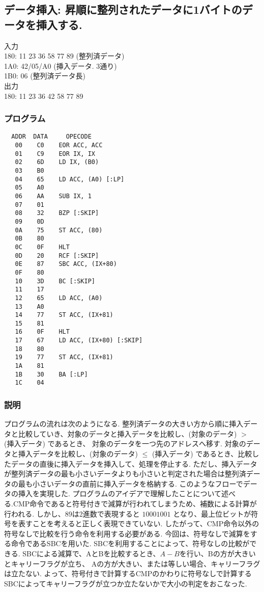 \documentclass[titlepage]{jsarticle}
\theoremstyle{definition}
\begin{document}
\subsection{データ挿入: 昇順に整列されたデータに1バイトのデータを挿入する.}
入力 \\
180: 11 23 36 58 77 89 (整列済データ) \\
1A0: 42/05/A0 (挿入データ. 3通り) \\
1B0: 06 (整列済データ長) \\

出力 \\
180: 11 23 36 42 58 77 89 \\

\subsubsection{プログラム}
\begin{lstlisting}
  ADDR  DATA     OPECODE
   00    C0    EOR ACC, ACC
   01    C9    EOR IX, IX
   02    6D    LD IX, (B0)
   03    B0
   04    65    LD ACC, (A0) [:LP]
   05    A0
   06    AA    SUB IX, 1
   07    01
   08    32    BZP [:SKIP]
   09    0D
   0A    75    ST ACC, (80)
   0B    80
   0C    0F    HLT
   0D    20    RCF [:SKIP]
   0E    87    SBC ACC, (IX+80)
   0F    80
   10    3D    BC [:SKIP]
   11    17
   12    65    LD ACC, (A0)
   13    A0
   14    77    ST ACC, (IX+81)
   15    81
   16    0F    HLT
   17    67    LD ACC, (IX+80) [:SKIP]
   18    80
   19    77    ST ACC, (IX+81)
   1A    81
   1B    30    BA [:LP]
   1C    04
\end{lstlisting}


\subsubsection{説明}
プログラムの流れは次のようになる.
整列済データの大きい方から順に挿入データと比較していき、対象のデータと挿入データを比較し、(対象のデータ) $>$ (挿入データ) であるとき、
対象のデータを一つ先のアドレスへ移す.
対象のデータと挿入データを比較し、(対象のデータ) $\leq$ (挿入データ) であるとき、比較したデータの直後に挿入データを挿入して、処理を停止する.
ただし、挿入データが整列済データの最も小さいデータよりも小さいと判定された場合は整列済データの最も小さいデータの直前に挿入データを格納する.
このようなフローでデータの挿入を実現した.
プログラムのアイデアで理解したことについて述べる.CMP命令であると符号付きで減算が行われてしまうため、補数による計算が行われる.
しかし、89は2進数で表現すると $10001001$ となり、最上位ビットが符号を表すことを考えると正しく表現できていない.
したがって、CMP命令以外の符号なしで比較を行う命令を利用する必要がある.
今回は、符号なしで減算をする命令であるSBCを用いた.
SBCを利用することによって、符号なしの比較ができる.
SBCによる減算で、AとBを比較するとき、$A - B$を行い、Bの方が大きいとキャリーフラグが立ち、
Aの方が大きい、または等しい場合、キャリーフラグは立たない.
よって、符号付きで計算するCMPのかわりに符号なしで計算するSBCによってキャリーフラグが立つか立たないかで大小の判定をおこなった.
\end{document}
